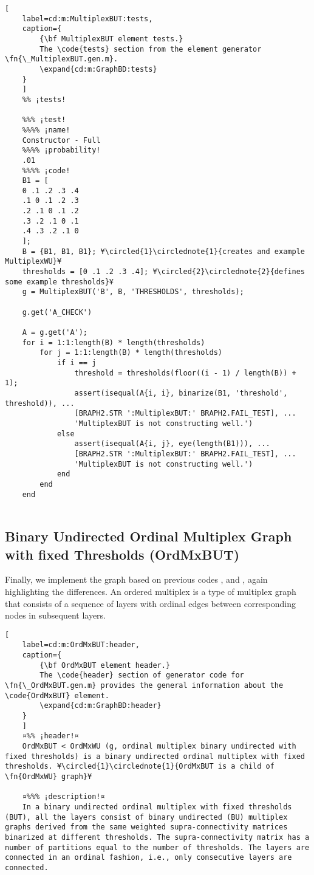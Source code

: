 \documentclass{tufte-handout}
\begin{document}
\begin{lstlisting}[
	label=cd:m:MultiplexBUT:tests,
	caption={
		{\bf MultiplexBUT element tests.}
		The \code{tests} section from the element generator \fn{\_MultiplexBUT.gen.m}.
		\expand{cd:m:GraphBD:tests}
	}
	]
	%% ¡tests!
	
	%%% ¡test!
	%%%% ¡name!
	Constructor - Full
	%%%% ¡probability!
	.01
	%%%% ¡code!
	B1 = [
	0 .1 .2 .3 .4 
	.1 0 .1 .2 .3
	.2 .1 0 .1 .2
	.3 .2 .1 0 .1
	.4 .3 .2 .1 0
	]; 
	B = {B1, B1, B1}; ¥\circled{1}\circlednote{1}{creates and example MultiplexWU}¥
	thresholds = [0 .1 .2 .3 .4]; ¥\circled{2}\circlednote{2}{defines some example thresholds}¥
	g = MultiplexBUT('B', B, 'THRESHOLDS', thresholds);
	
	g.get('A_CHECK')
	
	A = g.get('A');
	for i = 1:1:length(B) * length(thresholds)
		for j = 1:1:length(B) * length(thresholds)
			if i == j
				threshold = thresholds(floor((i - 1) / length(B)) + 1);
				assert(isequal(A{i, i}, binarize(B1, 'threshold', threshold)), ...
				[BRAPH2.STR ':MultiplexBUT:' BRAPH2.FAIL_TEST], ...
				'MultiplexBUT is not constructing well.')
			else
				assert(isequal(A{i, j}, eye(length(B1))), ...
				[BRAPH2.STR ':MultiplexBUT:' BRAPH2.FAIL_TEST], ...
				'MultiplexBUT is not constructing well.')            
			end
		end
	end
	
\end{lstlisting}



\clearpage

\subsection{Binary Undirected Ordinal Multiplex Graph with fixed Thresholds (OrdMxBUT)}

Finally, we implement the  graph based on previous codes ,  and , again highlighting the differences. An ordered multiplex is a type of multiplex graph that consists of a sequence of layers with ordinal edges between corresponding nodes in subsequent layers.


\begin{lstlisting}[
	label=cd:m:OrdMxBUT:header,
	caption={
		{\bf OrdMxBUT element header.}
		The \code{header} section of generator code for \fn{\_OrdMxBUT.gen.m} provides the general information about the \code{OrdMxBUT} element.
		\expand{cd:m:GraphBD:header}
	}
	]
	¤%% ¡header!¤
	OrdMxBUT < OrdMxWU (g, ordinal multiplex binary undirected with fixed thresholds) is a binary undirected ordinal multiplex with fixed thresholds. ¥\circled{1}\circlednote{1}{OrdMxBUT is a child of \fn{OrdMxWU} graph}¥
	
	¤%%% ¡description!¤
	In a binary undirected ordinal multiplex with fixed thresholds (BUT), all the layers consist of binary undirected (BU) multiplex graphs derived from the same weighted supra-connectivity matrices binarized at different thresholds. The supra-connectivity matrix has a number of partitions equal to the number of thresholds. The layers are connected in an ordinal fashion, i.e., only consecutive layers are connected.
\end{lstlisting}
\end{document}
